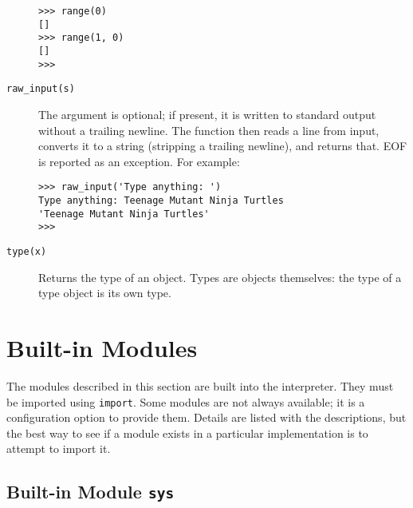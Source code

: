 \begin{description}
\begin{code}
\begin{verbatim}
>>> range(0)
[]
>>> range(1, 0)
[]
>>> 
\end{verbatim}\end{code}
\item[{\tt raw\_input(s)}]
The argument is optional; if present, it is written to standard output
without a trailing newline.
The function then reads a line from input, converts it to a string
(stripping a trailing newline), and returns that.
EOF is reported as an exception.
For example:
\begin{code}\begin{verbatim}
>>> raw_input('Type anything: ')
Type anything: Teenage Mutant Ninja Turtles
'Teenage Mutant Ninja Turtles'
>>> 
\end{verbatim}\end{code}
\item[{\tt type(x)}]
Returns the type of an object.
Types are objects themselves:
the type of a type object is its own type.
\end{description}

\section{Built-in Modules}

The modules described in this section are built into the interpreter.
They must be imported using
{\tt import}.
Some modules are not always available; it is a configuration option to
provide them.
Details are listed with the descriptions, but the best way to see if
a module exists in a particular implementation is to attempt to import
it.

\subsection{Built-in Module {\tt sys}}

